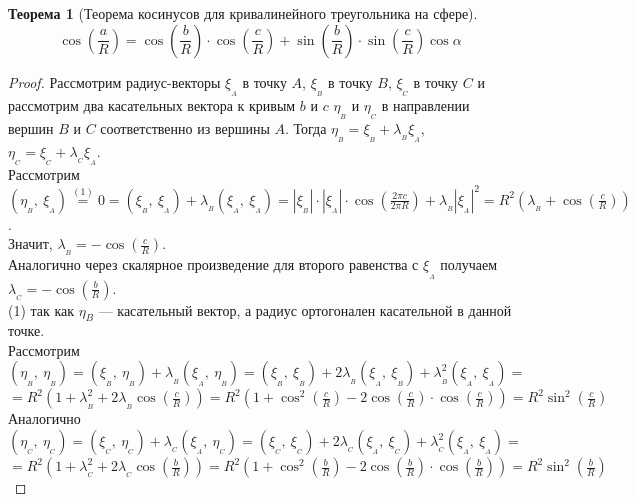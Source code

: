 \documentclass[12pt]{article}
\theoremstyle{plain}
\newtheorem{theorem}{Теорема}[section]
\begin{document}
    \begin{theorem}[Теорема косинусов для кривалинейного треугольника на сфере]
        $$\cos\left(\frac{a}{R}\right)=\cos\left(\frac{b}{R}\right)\cdot\cos\left(\frac{c}{R}\right)+\sin\left(\frac{b}{R}\right)\cdot\sin\left(\frac{c}{R}\right)\cos\alpha$$
    \end{theorem}
    \begin{proof}
        Рассмотрим радиус-векторы $\xi_{_A}$ в точку $A$, $\xi_{_B}$ в точку $B$, $\xi_{_C}$ в точку $C$ и рассмотрим два касательных вектора к кривым $b$ и $c$ $\eta_{_B}$ и $\eta_{_C}$ в направлении вершин $B$ и $C$ соответственно из вершины $A$. Тогда $\eta_{_B}=\xi_{_B}+\lambda_{_B}\xi_{_A}$, $\eta_{_C}=\xi_{_C}+\lambda_{_C}\xi_{_A}$.\\
        Рассмотрим $\left(\eta_{_B}, \ \xi_{_A}\right)\overset{(1)}{=}0=\left(\xi_{_B}, \ \xi_{_A}\right)+\lambda_{_B}\left(\xi_{_A}, \ \xi_{_A}\right)=|\xi_{_B}|\cdot|\xi_{_A}|\cdot\cos\left(\frac{2\pi c}{2\pi R}\right)+\lambda_{_B}|\xi_{_A}|^2=R^2\left(\lambda_{_B}+\cos\left(\frac{c}{R}\right)\right)$.\\
        Значит, $\lambda_{_B}=-\cos\left(\frac{c}{R}\right)$.\\
        Аналогично через скалярное произведение для второго равенства с $\xi_{_A}$ получаем $\lambda_{_C}=-\cos\left(\frac{b}{R}\right)$.\\
        (1) так как $\eta_B$ --- касательный вектор, а радиус ортогонален касательной в данной точке.\\
        Рассмотрим $\left(\eta_{_B}, \ \eta_{_B}\right)=\left(\xi_{_B}, \ \eta_{_B}\right)+\lambda_{_B}\left(\xi_{_A}, \ \eta_{_B}\right)=\left(\xi_{_B}, \ \xi_{_B}\right)+2\lambda_{_B}\left(\xi_{_A}, \ \xi_{_B}\right)+\lambda_{_B}^2\left(\xi_{_A}, \ \xi_{_A}\right)=$\\
        $=R^2\left(1+\lambda_{_B}^2+2\lambda_{_B}\cos\left(\frac{c}{R}\right)\right)=R^2\left(1+\cos^2\left(\frac{c}{R}\right)-2\cos\left(\frac{c}{R}\right)\cdot\cos\left(\frac{c}{R}\right)\right)=R^2\sin^2\left(\frac{c}{R}\right)$\\
        Аналогично $\left(\eta_{_C}, \ \eta_{_C}\right)=\left(\xi_{_C}, \ \eta_{_C}\right)+\lambda_{_C}\left(\xi_{_A}, \ \eta_{_C}\right)=\left(\xi_{_C}, \ \xi_{_C}\right)+2\lambda_{_C}\left(\xi_{_A}, \ \xi_{_C}\right)+\lambda_{_C}^2\left(\xi_{_A}, \ \xi_{_A}\right)=$\\
        $=R^2\left(1+\lambda_{_C}^2+2\lambda_{_C}\cos\left(\frac{b}{R}\right)\right)=R^2\left(1+\cos^2\left(\frac{b}{R}\right)-2\cos\left(\frac{b}{R}\right)\cdot\cos\left(\frac{b}{R}\right)\right)=R^2\sin^2\left(\frac{b}{R}\right)$\\

\end{proof}
\end{document}
